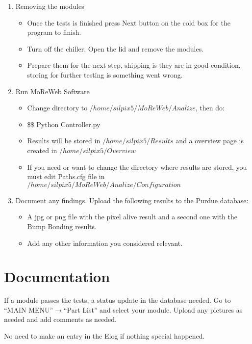 \documentclass[12pt]{unlsilabsop}
\begin{document}
\begin{enumerate}
   \item Removing the modules
   \begin{itemize}
   		\item Once the tests is finished press Next button on the cold box for the program to finish.
   		\item Turn off the chiller. Open the lid and remove the modules.
   		\item Prepare them for the next step, shipping is they are in good condition, storing for further testing is something went wrong.
	\end{itemize} 
	 \item Run MoReWeb Software
    \begin{itemize}
    		\item Change directory to $/home/silpix5/MoReWeb/Analize$, then do:
    		\item \$\$ Python Controller.py
    		\item Results will be stored in $/home/silpix5/Results$ and a overview page is created in $/home/silpix5/Overview$
    		\item If you need or want to change the directory where results are stored, you must edit Paths.cfg file in $/home/silpix5/MoReWeb/Analize/Configuration$
   \end{itemize}  	
    \item Document any findings. Upload the following results to the Purdue database:
    \begin{itemize}
    		\item A jpg or png file with the pixel alive result and a second one with the Bump Bonding results.
    		\item Add any other information you considered relevant.
    \end{itemize}
\end{enumerate}

\section{Documentation}
If a module passes the tests, a status update in the database needed. Go to ``MAIN MENU''$\rightarrow$``Part List'' and select your module. Upload any pictures as needed and add comments as needed.

No need to make an entry in the Elog if nothing special happened.
\end{document}

